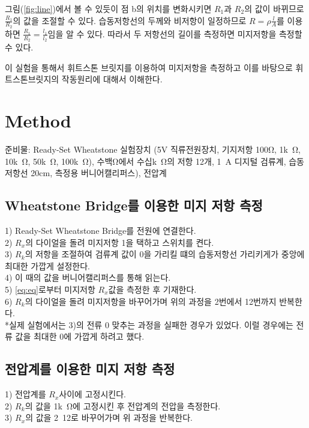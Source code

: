 \documentclass[a4paper]{article}
\begin{document}
 	그림(\ref{fig:line})에서 볼 수 있듯이 점 b의 위치를 변화시키면 $R_1$과 $R_2$의 값이 바뀌므로 $\frac{R_1}{R_2}$의 값을 조절할 수 있다.
 	습동저항선의 두께와 비저항이 일정하므로 $R = \rho \frac{l}{A}$를 이용하면 $\frac{R_1}{R_2} = \frac{l_1}{l_2}$임을 알 수 있다. 
 	따라서 두 저항선의 길이를 측정하면 미지저항을 측정할 수 있다.

 	이 실험을 통해서 휘트스톤 브릿지를 이용하여 미지저항을 측정하고 이를 바탕으로 휘트스톤브릿지의 작동원리에 대해서 이해한다.

\newpage

 	\section{Method}
 	준비물: Ready-Set Wheatstone 실험장치 (5V 직류전원장치, 기지저항 100\si{\ohm}, 1\si{k\ohm}, 10\si{k\ohm}, 50\si{k\ohm}, 100\si{k\ohm}), 수백\si{\ohm}에서 수십\si{k\ohm}의 저항 12개, 1\si{\micro{}A} 디지털 검류계, 습동저항선 20\si{cm}, 측정용 버니어캘리퍼스), 전압계

 	\subsection{Wheatstone Bridge를 이용한 미지 저항 측정}
 	1) Ready-Set Wheatstone Bridge를 전원에 연결한다. \\
 	2) $R_x$의 다이얼을 돌려 미지저항 1을 택하고 스위치를 켠다. \\
 	3) $R_k$의 저항을 조절하여 검류계 값이 0을 가리킬 떄의 습동저항선 가리키게가 중앙에 최대한 가깝게 설정한다. \\
 	4) 이 때의 값을 버니어캘리퍼스를 통해 읽는다. \\
 	5) \ref{eq:eq}로부터 미지저항 $R_x$값을 측정한 후 기재한다. \\
 	6) $R_k$의 다이얼을 돌려 미지저항을 바꾸어가며 위의 과정을 2번에서 12번까지 반복한다. \\
 	*실제 실험에서는 3)의 전류 0 맞추는 과정을 실패한 경우가 있었다.
 	이럴 경우에는 전류 값을 최대한 0에 가깝게 하려고 했다. 

 	\subsection{전압계를 이용한 미지 저항 측정}
 	1) 전압계를 $R_x$사이에 고정시킨다. \\
 	2) $R_k$의 값을 1\si{k\ohm}에 고정시킨 후 전압계의 전압을 측정한다. \\
 	3) $R_x$의 값을 2~12로 바꾸어가며 위 과정을 반복한다.
\end{document}
